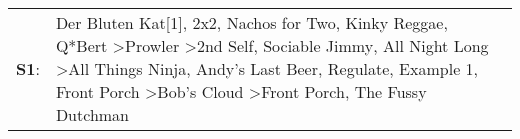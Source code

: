 \begin{supertabular}{p{0.03\textwidth}p{0.92\textwidth}}
 \textbf{S1}:  &  Der Bluten Kat[1]\textsuperscript{}, \enspace 2x2\textsuperscript{}, \enspace Nachos for Two\textsuperscript{}, \enspace Kinky Reggae\textsuperscript{}, \enspace Q*Bert\textsuperscript{} \textgreater \enspace Prowler\textsuperscript{} \textgreater \enspace 2nd Self\textsuperscript{}, \enspace Sociable Jimmy\textsuperscript{}, \enspace All Night Long\textsuperscript{} \textgreater \enspace All Things Ninja\textsuperscript{}, \enspace Andy's Last Beer\textsuperscript{}, \enspace Regulate\textsuperscript{}, \enspace Example 1\textsuperscript{}, \enspace Front Porch\textsuperscript{} \textgreater \enspace Bob's Cloud\textsuperscript{} \textgreater \enspace Front Porch\textsuperscript{}, \enspace The Fussy Dutchman\textsuperscript{}  \enspace  \\
\end{supertabular}
